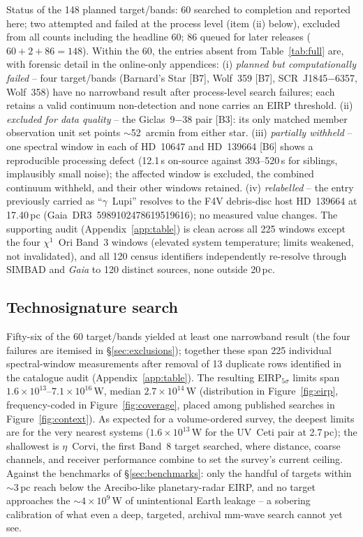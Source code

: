 \documentclass{openjournal}
\begin{document}
Status of the 148 planned target/bands: 60 searched to completion and
reported here; two attempted and failed at the process level (item (ii)
below), excluded from all counts including the headline 60; 86 queued
for later releases ($60+2+86=148$). Within the 60, the entries absent
from Table~\ref{tab:full} are, with forensic detail in the online-only
appendices:
(i) \emph{planned but computationally failed} -- four target/bands
(Barnard's Star [B7], Wolf~359 [B7], SCR~J1845$-$6357, Wolf~358) have
no narrowband result after process-level search failures; each retains
a valid continuum non-detection and none carries an EIRP threshold.
(ii) \emph{excluded for data quality} -- the Giclas~9$-$38 pair [B3]:
its only matched member observation unit set points $\sim$52~arcmin
from either star.
(iii) \emph{partially withheld} -- one spectral window in each of
HD~10647 and HD~139664 [B6] shows a reproducible processing defect
(12.1\,s on-source against 393--520\,s for siblings, implausibly small
noise); the affected window is excluded, the combined continuum
withheld, and their other windows retained.
(iv) \emph{relabelled} -- the entry previously carried as
``$\gamma$~Lupi'' resolves to the F4V debris-disc host HD~139664 at
17.40\,pc (Gaia~DR3~5989102478619519616); no measured value changes.
The supporting audit (Appendix~\ref{app:table}) is clean across all
225 windows except the four $\chi^{1}$~Ori Band~3 windows (elevated
system temperature; limits weakened, not invalidated), and all 120
census identifiers independently re-resolve through SIMBAD and
\emph{Gaia} to 120 distinct sources, none outside 20\,pc.

\subsection{Technosignature search}
\label{sec:technosearch}

Fifty-six of the 60 target/bands yielded at least one narrowband
result (the four failures are itemised in \S\ref{sec:exclusions});
together these span 225 individual spectral-window measurements after
removal of 13 duplicate rows identified in the catalogue audit
(Appendix~\ref{app:table}). The resulting EIRP$_{5\sigma}$ limits span
$1.6\times10^{13}$--$7.1\times10^{16}$\,W, median
$2.7\times10^{14}$\,W (distribution in Figure~\ref{fig:eirp},
frequency-coded in Figure~\ref{fig:coverage}, placed among published
searches in Figure~\ref{fig:context}). As expected for a
volume-ordered survey, the deepest limits are for the very nearest
systems ($1.6\times10^{13}$\,W for the UV~Ceti pair at 2.7\,pc); the
shallowest is $\eta$~Corvi, the first Band~8 target searched, where
distance, coarse channels, and receiver performance combine to set
the survey's current ceiling. Against the benchmarks of
\S\ref{sec:benchmarks}: only the handful of targets within
$\sim$3\,pc reach below the Arecibo-like planetary-radar EIRP, and no
target approaches the $\sim4\times10^{9}$\,W of unintentional Earth
leakage -- a sobering calibration of what even a deep, targeted,
archival mm-wave search cannot yet see.
\end{document}
